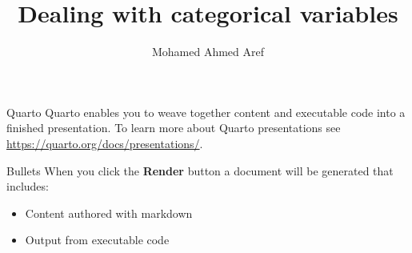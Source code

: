 \documentclass[
  ignorenonframetext,
]{beamer}
\title{Dealing with categorical variables}
\author{Mohamed Ahmed Aref}
\date{}
\providecommand{\tightlist}{%
  \setlength{\itemsep}{0pt}\setlength{\parskip}{0pt}}\usepackage{longtable,booktabs,array}
\begin{document}
\frame{\titlepage}


\begin{frame}{Quarto}
\label{quarto}
Quarto enables you to weave together content and executable code into a
finished presentation. To learn more about Quarto presentations see
\url{https://quarto.org/docs/presentations/}.
\end{frame}

\begin{frame}{Bullets}
\label{bullets}
When you click the \textbf{Render} button a document will be generated
that includes:

\begin{itemize}
\tightlist
\item
  Content authored with markdown
\item
  Output from executable code
\end{itemize}
\end{frame}
\end{document}
